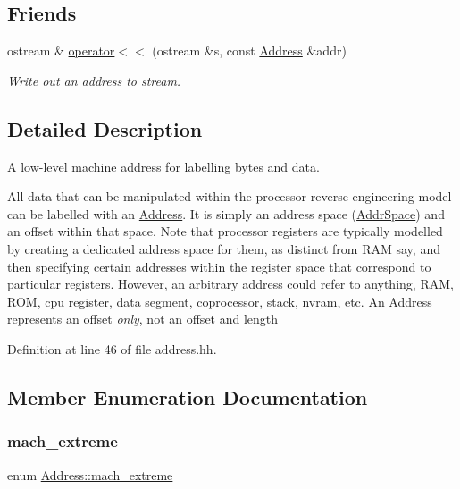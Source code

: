 \subsection*{Friends}
\begin{DoxyCompactItemize}
\item 
ostream \& \mbox{\hyperlink{class_address_aad61b7eee4f2506349c6a517a1271faa}{operator$<$$<$}} (ostream \&s, const \mbox{\hyperlink{class_address}{Address}} \&addr)
\begin{DoxyCompactList}\small\item\em Write out an address to stream. \end{DoxyCompactList}\end{DoxyCompactItemize}


\subsection{Detailed Description}
A low-\/level machine address for labelling bytes and data. 

All data that can be manipulated within the processor reverse engineering model can be labelled with an \mbox{\hyperlink{class_address}{Address}}. It is simply an address space (\mbox{\hyperlink{class_addr_space}{Addr\+Space}}) and an offset within that space. Note that processor registers are typically modelled by creating a dedicated address space for them, as distinct from R\+AM say, and then specifying certain addresses within the register space that correspond to particular registers. However, an arbitrary address could refer to anything, R\+AM, R\+OM, cpu register, data segment, coprocessor, stack, nvram, etc. An \mbox{\hyperlink{class_address}{Address}} represents an offset {\itshape only}, not an offset and length 

Definition at line 46 of file address.\+hh.



\subsection{Member Enumeration Documentation}
\mbox{\label{class_address_ab6dfc48b4779dab420c4ae0bc5aaffd7}} 
\subsubsection{\texorpdfstring{mach\_extreme}{mach\_extreme}}
{\footnotesize\ttfamily enum \mbox{\hyperlink{class_address_ab6dfc48b4779dab420c4ae0bc5aaffd7}{Address\+::mach\+\_\+extreme}}}



